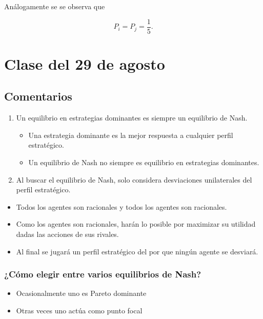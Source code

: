 \documentclass[letterpaper,12pt,twocolumn]{report}
\begin{document}
Análogamente se se observa que 

$$ P_i = P_j = \dfrac{1}{5}. $$

\section{Clase del 29 de agosto}

\subsection*{Comentarios}

\begin{enumerate}
	\item Un equilibrio en estrategias dominantes es siempre un equilibrio de Nash.
	\begin{itemize}
		\item Una estrategia dominante es la mejor respuesta a cualquier perfil estratégico.
		\item Un equilibrio de Nash no siempre es equilibrio en estrategias dominantes.
	\end{itemize}
	\item Al buscar el equilibrio de Nash, solo considera desviaciones unilaterales del perfil estratégico.
\end{enumerate}


\begin{tcolorbox}[title=Fundamentos del equilibrio de Nash]
	\begin{itemize}
		\item Todos los agentes son racionales y todos los agentes son racionales.
		\item Como los agentes son racionales, harán lo posible por maximizar su utilidad dadas las acciones de sus rivales.
		\item Al final se jugará un perfil estratégico del por que ningún agente se desviará.
	\end{itemize}
\end{tcolorbox}

\subsubsection*{¿Cómo elegir entre varios equilibrios de Nash?}

\begin{itemize}
	\item Ocasionalmente uno es Pareto dominante
	\item Otras veces uno actúa como punto focal
\end{itemize}
\end{document}
